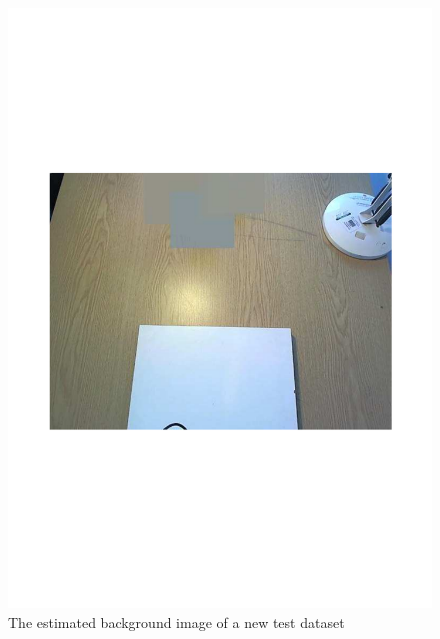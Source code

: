 \documentclass{article}
\begin{document}
\begin{figure}[h!]
\begin{minipage}[b]{0.5\linewidth}
\includegraphics[scale=0.3]{../Drawings/backdata7.pdf}
\caption{The estimated background image of a new test dataset}
\label{fig:backdata7}
\end{minipage}
\hspace{0.5cm}
\begin{minipage}[b]{0.5\linewidth}

\end{minipage}
\end{figure}
\end{document}
